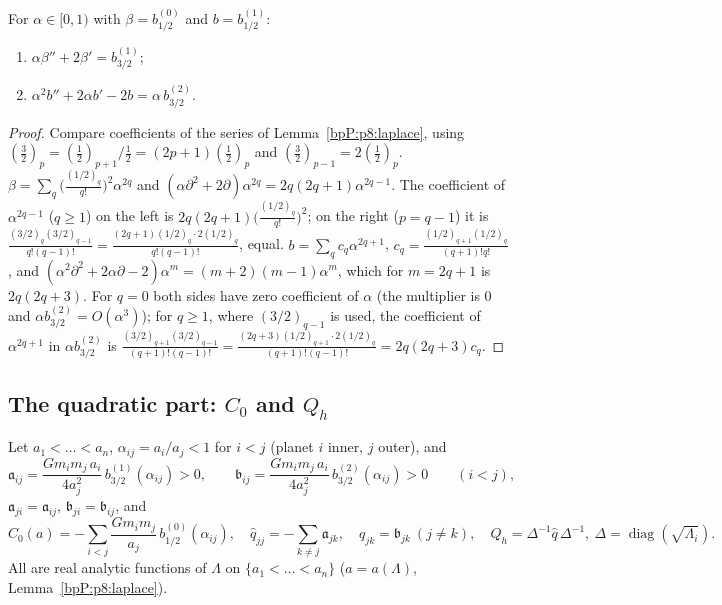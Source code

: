 \begin{lemma}\label{bpP:p8:identities}
For $\alpha\in[0,1)$ with $\beta=b_{1/2}^{(0)}$ and $b=b_{1/2}^{(1)}$:
\begin{enumerate}[label=(I\arabic*)]
\item $\alpha\beta''+2\beta'=b_{3/2}^{(1)}$;
\item $\alpha^2b''+2\alpha b'-2b=\alpha\,b_{3/2}^{(2)}$.
\end{enumerate}
\end{lemma}
\begin{proof}
Compare coefficients of the series of Lemma~\ref{bpP:p8:laplace}, using $(\tfrac32)_p=(\tfrac12)_{p+1}/\tfrac12=(2p+1)(\tfrac12)_p$ and $(\tfrac32)_{p-1}=2(\tfrac12)_p$.
\label{stepP:p8:id-1} $\beta=\sum_q\big(\tfrac{(1/2)_q}{q!}\big)^2\alpha^{2q}$ and $(\alpha\partial^2+2\partial)\alpha^{2q}=2q(2q+1)\alpha^{2q-1}$. The coefficient of $\alpha^{2q-1}$ ($q\ge1$) on the left is $2q(2q+1)\big(\tfrac{(1/2)_q}{q!}\big)^2$; on the right ($p=q-1$) it is $\frac{(3/2)_q(3/2)_{q-1}}{q!(q-1)!}=\frac{(2q+1)(1/2)_q\cdot2(1/2)_q}{q!(q-1)!}$, equal.
\label{stepP:p8:id-2} $b=\sum_q c_q\alpha^{2q+1}$, $c_q=\frac{(1/2)_{q+1}(1/2)_q}{(q+1)!q!}$, and $(\alpha^2\partial^2+2\alpha\partial-2)\alpha^m=(m+2)(m-1)\alpha^m$, which for $m=2q+1$ is $2q(2q+3)$. For $q=0$ both sides have zero coefficient of $\alpha$ (the multiplier is $0$ and $\alpha b_{3/2}^{(2)}=O(\alpha^3)$); for $q\ge1$, where $(3/2)_{q-1}$ is used, the coefficient of $\alpha^{2q+1}$ in $\alpha b_{3/2}^{(2)}$ is $\frac{(3/2)_{q+1}(3/2)_{q-1}}{(q+1)!(q-1)!}=\frac{(2q+3)(1/2)_{q+1}\cdot2(1/2)_q}{(q+1)!(q-1)!}=2q(2q+3)c_q$.
\end{proof}

\subsection{The quadratic part: $C_0$ and $Q_h$}\label{bpP:p8:sec-quad}

\begin{definition}\label{bpP:p8:coeffs}
Let $a_1<\dots<a_n$, $\alpha_{ij}=a_i/a_j<1$ for $i<j$ (planet $i$ inner, $j$ outer), and
\[\mathfrak a_{ij}=\frac{Gm_im_j\,a_i}{4a_j^2}\,b_{3/2}^{(1)}(\alpha_{ij})>0,\qquad \mathfrak b_{ij}=\frac{Gm_im_j\,a_i}{4a_j^2}\,b_{3/2}^{(2)}(\alpha_{ij})>0\qquad(i<j),\]
$\mathfrak a_{ji}=\mathfrak a_{ij}$, $\mathfrak b_{ji}=\mathfrak b_{ij}$, and
\[C_0(a)=-\sum_{i<j}\frac{Gm_im_j}{a_j}\,b_{1/2}^{(0)}(\alpha_{ij}),\quad\hat q_{jj}=-\sum_{k\ne j}\mathfrak a_{jk},\quad\hat q_{jk}=\mathfrak b_{jk}\ (j\ne k),\quad Q_h=\Delta^{-1}\hat q\,\Delta^{-1},\ \Delta=\operatorname{diag}(\sqrt{\Lambda_i}).\]
All are real analytic functions of $\Lambda$ on $\{a_1<\dots<a_n\}$ ($a=a(\Lambda)$, Lemma~\ref{bpP:p8:laplace}).
\end{definition}

